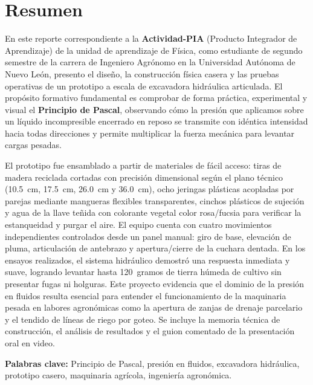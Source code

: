 \section*{Resumen}
En este reporte correspondiente a la \textbf{Actividad-PIA} (Producto Integrador de Aprendizaje) de la unidad de aprendizaje de Física, como estudiante de segundo semestre de la carrera de Ingeniero Agrónomo en la Universidad Autónoma de Nuevo León, presento el diseño, la construcción física casera y las pruebas operativas de un prototipo a escala de excavadora hidráulica articulada. El propósito formativo fundamental es comprobar de forma práctica, experimental y visual el \textbf{Principio de Pascal}, observando cómo la presión que aplicamos sobre un líquido incompresible encerrado en reposo se transmite con idéntica intensidad hacia todas direcciones y permite multiplicar la fuerza mecánica para levantar cargas pesadas.

El prototipo fue ensamblado a partir de materiales de fácil acceso: tiras de madera reciclada cortadas con precisión dimensional según el plano técnico (\SI{10.5}{cm}, \SI{17.5}{cm}, \SI{26.0}{cm} y \SI{36.0}{cm}), ocho jeringas plásticas acopladas por parejas mediante mangueras flexibles transparentes, cinchos plásticos de sujeción y agua de la llave teñida con colorante vegetal color rosa/fucsia para verificar la estanqueidad y purgar el aire. El equipo cuenta con cuatro movimientos independientes controlados desde un panel manual: giro de base, elevación de pluma, articulación de antebrazo y apertura/cierre de la cuchara dentada. En los ensayos realizados, el sistema hidráulico demostró una respuesta inmediata y suave, logrando levantar hasta \SI{120}{gramos} de tierra húmeda de cultivo sin presentar fugas ni holguras. Este proyecto evidencia que el dominio de la presión en fluidos resulta esencial para entender el funcionamiento de la maquinaria pesada en labores agronómicas como la apertura de zanjas de drenaje parcelario y el tendido de líneas de riego por goteo. Se incluye la memoria técnica de construcción, el análisis de resultados y el guion comentado de la presentación oral en video.

\vspace{0.25cm}
\noindent\textbf{Palabras clave:} Principio de Pascal, presión en fluidos, excavadora hidráulica, prototipo casero, maquinaria agrícola, ingeniería agronómica.

